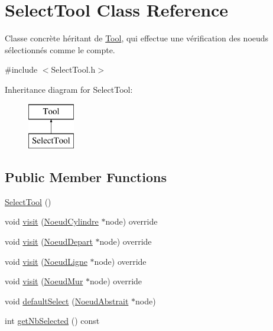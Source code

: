 \hypertarget{class_select_tool}{}\section{Select\+Tool Class Reference}
\label{class_select_tool}


Classe concrète héritant de \hyperlink{class_tool}{Tool}, qui effectue une vérification des noeuds sélectionnés comme le compte.  




{\ttfamily \#include $<$Select\+Tool.\+h$>$}

Inheritance diagram for Select\+Tool\+:\begin{figure}[H]
\begin{center}
\leavevmode
\includegraphics[height=2.000000cm]{class_select_tool}
\end{center}
\end{figure}
\subsection*{Public Member Functions}
\begin{DoxyCompactItemize}
\item 
\hyperlink{group__inf2990_ga2174af55e744036f0ccc5ce1fe25ddb1}{Select\+Tool} ()
\item 
void \hyperlink{group__inf2990_gacd9fee116b738725ab0f664029253fa0}{visit} (\hyperlink{class_noeud_cylindre}{Noeud\+Cylindre} $\ast$node) override
\item 
void \hyperlink{group__inf2990_ga392f7eb2a74106cff675878f5453a9d3}{visit} (\hyperlink{class_noeud_depart}{Noeud\+Depart} $\ast$node) override
\item 
void \hyperlink{group__inf2990_ga842d1455b15f04fc9e97fc5716f0d5be}{visit} (\hyperlink{class_noeud_ligne}{Noeud\+Ligne} $\ast$node) override
\item 
void \hyperlink{group__inf2990_gab6a7d46d8fad7c1045678b6dec3c9400}{visit} (\hyperlink{class_noeud_mur}{Noeud\+Mur} $\ast$node) override
\item 
void \hyperlink{group__inf2990_ga01b8ec1322baa74ee48e5087337bc959}{default\+Select} (\hyperlink{class_noeud_abstrait}{Noeud\+Abstrait} $\ast$node)
\item 
int \hyperlink{group__inf2990_gaca4f60cc972b5d9df612f48c18c8364a}{get\+Nb\+Selected} () const 
\end{DoxyCompactItemize}


